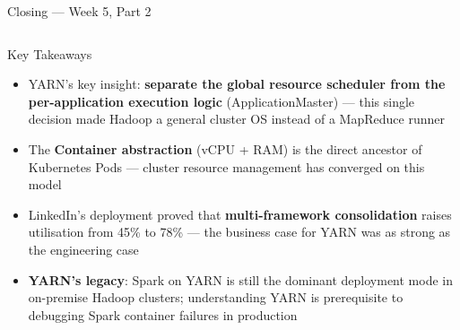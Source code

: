 \documentclass[aspectratio=169,10pt]{beamer}
\begin{document}
\begin{frame}{Closing — Week 5, Part 2}
  \begin{columns}[T]
      \begin{block}{Key Takeaways}
        \begin{itemize}
          \item YARN's key insight: \textbf{separate the global resource
                scheduler from the per-application execution logic}
                (ApplicationMaster) — this single decision made Hadoop
                a general cluster OS instead of a MapReduce runner
          \item The \textbf{Container abstraction} (vCPU + RAM)
                is the direct ancestor of Kubernetes Pods —
                cluster resource management has converged on this model
          \item LinkedIn's deployment proved that \textbf{multi-framework
                consolidation} raises utilisation from 45\% to 78\%
                — the business case for YARN was as strong as the
                engineering case
          \item \textbf{YARN's legacy}: Spark on YARN is still the
                dominant deployment mode in on-premise Hadoop clusters;
                understanding YARN is prerequisite to debugging Spark
                container failures in production
        \end{itemize}
      \end{block}


\end{columns}
\end{frame}
\end{document}
